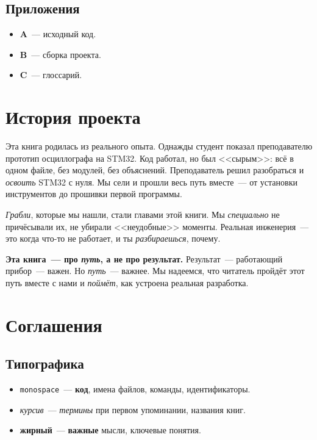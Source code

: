 \subsection{Приложения}

\begin{itemize}
    \item \textbf{A}~--- исходный код.
    \item \textbf{B}~--- сборка проекта.
    \item \textbf{C}~--- глоссарий.
\end{itemize}

\section{История проекта}
\label{sec:intro-history}

Эта книга родилась из реального опыта. Однажды студент
показал преподавателю прототип осциллографа на STM32.
Код работал, но был <<сырым>>: всё в одном файле,
без модулей, без объяснений. Преподаватель решил
разобраться и \emph{освоить} STM32 с нуля. Мы сели
и прошли весь путь вместе~--- от установки инструментов
до прошивки первой программы.

\emph{Грабли}, которые мы нашли, стали главами этой
книги. Мы \emph{специально} не причёсывали их, не убирали
<<неудобные>> моменты. Реальная инженерия~--- это когда
что-то не работает, и ты \emph{разбираешься}, почему.

\begin{ideabox}
\textbf{Эта книга~--- про \emph{путь}, а не про результат.}
Результат~--- работающий прибор~--- важен. Но \emph{путь}~---
важнее. Мы надеемся, что читатель пройдёт этот путь вместе
с нами и \emph{поймёт}, как устроена реальная разработка.
\end{ideabox}

\section{Соглашения}
\label{sec:intro-conventions}

\subsection{Типографика}

\begin{itemize}
    \item \texttt{monospace}~--- \textbf{код}, имена файлов,
          команды, идентификаторы.
    \item \textit{курсив}~--- \emph{термины} при первом
          упоминании, названия книг.
    \item \textbf{жирный}~--- \textbf{важные} мысли, ключевые
          понятия.
\end{itemize}

